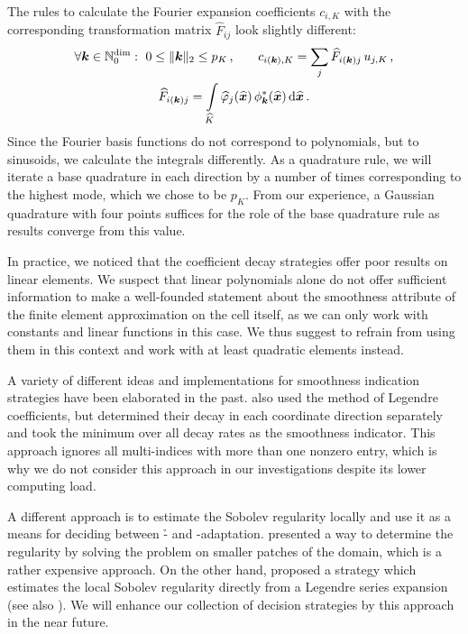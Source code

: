 The rules to calculate the Fourier expansion coefficients $c_{i,K}$ with the corresponding transformation matrix $\widehat{F}_{ij}$ look slightly different:
\begin{gather}
\forall \tuple{k} \in \mathbb{N}_0^\text{dim} : ~ 0 \leq \|\tuple{k}\|_2 \leq p_K \, \text{,} \qquad
c_{i(\tuple{k}),K} = \sum\limits_j \widehat{F}_{i(\tuple{k})j} \, u_{j,K} \,\text{,} \\
\widehat{F}_{i(\tuple{k})j} = \int\limits_{\widehat{K}} \widehat{\varphi}_j(\vec{\widehat{x}}) \, \phi_\tuple{k}^\ast(\vec{\widehat{x}}) \differential{\vec{\widehat{x}}} \,\text{.}
\end{gather}
Since the Fourier basis functions do not correspond to polynomials, but to sinusoids, we calculate the integrals differently. As a quadrature rule, we will iterate a base quadrature in each direction by a number of times corresponding to the highest mode, which we chose to be $p_K$. From our experience, a Gaussian quadrature with four points suffices for the role of the base quadrature rule as results converge from this value.

In practice, we noticed that the coefficient decay strategies offer poor results on linear elements. We suspect that linear polynomials alone do not offer sufficient information to make a well-founded statement about the smoothness attribute of the finite element approximation on the cell itself, as we can only work with constants and linear functions in this case. We thus suggest to refrain from using them in this context and work with at least quadratic elements instead.

A variety of different ideas and implementations for smoothness indication strategies have been elaborated in the past. \textcite{davydov2017} also used the method of Legendre coefficients, but determined their decay in each coordinate direction separately and took the minimum over all decay rates as the smoothness indicator. This approach ignores all multi-indices with more than one nonzero entry, which is why we do not consider this approach in our investigations despite its lower computing load.

A different approach is to estimate the Sobolev regularity locally and use it as a means for deciding between \h- and \p-adaptation. \textcite{ainsworth1998} presented a way to determine the regularity by solving the problem on smaller patches of the domain, which is a rather expensive approach. On the other hand, \textcite{houston2003} proposed a strategy which estimates the local Sobolev regularity directly from a Legendre series expansion (see also \textcite[Sec.~2.4]{houston2005}).
We will enhance our collection of decision strategies by this approach in the near future.

